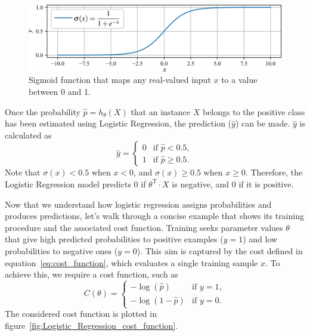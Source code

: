 \documentclass[12pt,letter]{article}
\begin{document}
		\begin{figure}[H]
			\centering
			\includegraphics[width=6.1in]{../figures/sigmoid_function}
			\caption{Sigmoid function that maps any real-valued input $x$ to a value between 0 and 1. }
			\label{fig:sigmoid_function}
		\end{figure}

Once the probability $\hat{p} = h_\theta(X)$ that an instance $X$ belongs to the positive class has been estimated using Logistic Regression, the prediction ($\hat{y}$) can be made. $\hat{y}$ is calculated as
\begin{equation}
  \hat{y} = 
  \begin{cases}
  0 & \text{if } \hat{p} < 0.5, \\
  1 & \text{if } \hat{p} \ge 0.5.
  \end{cases}
\label{eq:model_prediction}
\end{equation}
Note that $\sigma(x) < 0.5$ when $x < 0$, and $\sigma(x) \ge 0.5$ when $x \ge 0$. Therefore, the Logistic Regression model predicts 0 if $\theta^\text{T} \cdot X$ is negative, and 0 if it is positive.

Now that we understand how logistic regression assigns probabilities and produces predictions, let's walk through a concise example that shows its training procedure and the associated cost function.
Training seeks parameter values $\theta$ that give high predicted probabilities to positive examples ($y = 1$) and low probabilities to negative ones ($y = 0$). This aim is captured by the cost defined in equation~\ref{eq:cost_function}, which evaluates a single training sample $x$. To achieve this, we require a cost function, such as 
\begin{equation}
  C(\theta) = 
  \begin{cases}
  - \log (\hat{p}) & \text{if } y=1, \\
  - \log (1-\hat{p}) & \text{if } y=0.
  \end{cases}
\label{eq:cost_function}
\end{equation}
The considered cost function is plotted in figure~\ref{fig:Logistic_Regression_cost_function}.
\end{document}
